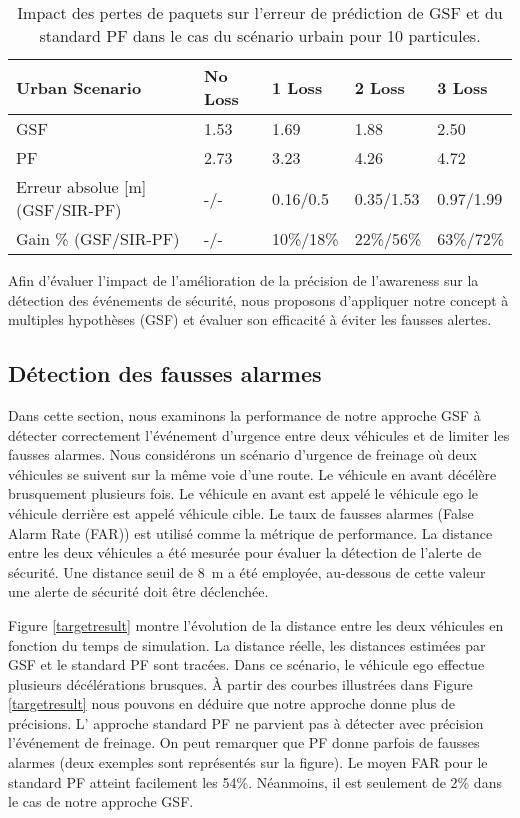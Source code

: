 \begin{table}
	\centering
	\begin{tabular}{lllll}
		\toprule
\textbf{Urban Scenario} & \textbf{No Loss} & \textbf{1 Loss} & \textbf{2 Loss} & \textbf{3 Loss}\\
\midrule 
GSF & 1.53 & 1.69 & 1.88 & 2.50\\
\midrule 
PF & 2.73 & 3.23 & 4.26 & 4.72\\
\midrule
Erreur absolue [m] (GSF/SIR-PF)& -/- & 0.16/0.5 & 0.35/1.53 & 0.97/1.99 \\
\midrule
Gain \% (GSF/SIR-PF)& -/- & 10\%/18\% & 22\%/56\% & 63\%/72\% \\ 
		\bottomrule
	\end{tabular}
	\caption{Impact des pertes de paquets sur l'erreur de prédiction de GSF et du standard PF dans le cas du scénario urbain pour 10 particules.}
	\label{tab:plossaurban}
\end{table}

Afin d'évaluer l'impact de l'amélioration de la précision de l'awareness sur la détection des événements de sécurité, nous proposons d'appliquer notre concept à multiples hypothèses (GSF) et évaluer son efficacité à éviter les fausses alertes.

\subsection{Détection des fausses alarmes}

Dans cette section, nous examinons la performance de notre approche GSF à détecter correctement l'événement d'urgence entre deux véhicules et de limiter les fausses alarmes. Nous considérons un scénario d'urgence de freinage où deux véhicules se suivent sur la même voie d'une route. Le véhicule en avant décélère brusquement plusieurs fois. Le véhicule en avant est appelé le véhicule ego le véhicule derrière est appelé véhicule cible.
Le taux de fausses alarmes (False Alarm Rate (FAR)) est utilisé comme la métrique de performance. La distance entre les deux véhicules a été mesurée pour évaluer la détection de l'alerte de sécurité. Une distance seuil de 8~m a été employée, au-dessous de cette valeur une alerte de sécurité doit être déclenchée.

Figure \ref{targetresult} montre l'évolution de la distance entre les deux véhicules en fonction du temps de simulation. La distance réelle, les distances estimées par GSF et le standard PF sont tracées. Dans ce scénario, le véhicule ego effectue plusieurs décélérations brusques. À partir des courbes illustrées dans Figure \ref{targetresult} nous pouvons en déduire que notre approche donne plus de précisions. L' approche standard PF ne parvient pas à détecter avec précision l'événement de freinage. On peut remarquer que PF donne parfois de fausses alarmes (deux exemples sont représentés sur la figure). Le moyen FAR pour le standard PF atteint facilement les 54\%. Néanmoins, il est seulement de 2\% dans le cas de notre approche GSF.

